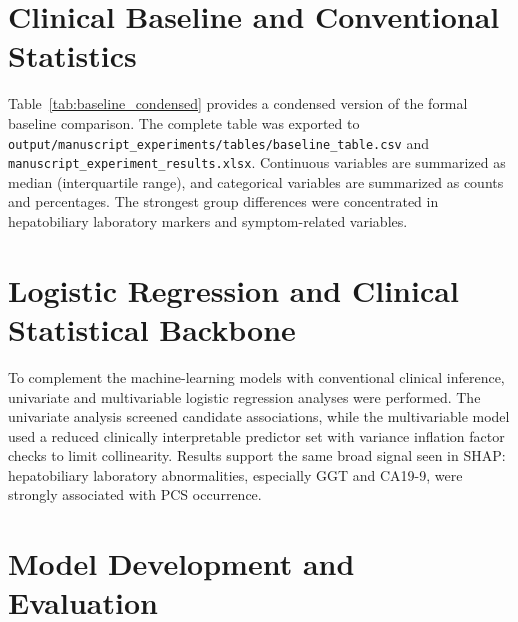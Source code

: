 \documentclass[11pt]{article}
\begin{document}
\section{Clinical Baseline and Conventional Statistics}

Table~\ref{tab:baseline_condensed} provides a condensed version of the formal baseline comparison. The complete table was exported to \texttt{output/manuscript\_experiments/tables/baseline\_table.csv} and \texttt{manuscript\_experiment\_results.xlsx}. Continuous variables are summarized as median (interquartile range), and categorical variables are summarized as counts and percentages. The strongest group differences were concentrated in hepatobiliary laboratory markers and symptom-related variables.

\begin{table}[H]
\centering
\caption{Condensed baseline comparison between PCS and non-PCS groups.}
\label{tab:baseline_condensed}
\scriptsize
\resizebox{\textwidth}{!}{\TableBaselineCondensed}
\end{table}

\section{Logistic Regression and Clinical Statistical Backbone}

To complement the machine-learning models with conventional clinical inference, univariate and multivariable logistic regression analyses were performed. The univariate analysis screened candidate associations, while the multivariable model used a reduced clinically interpretable predictor set with variance inflation factor checks to limit collinearity. Results support the same broad signal seen in SHAP: hepatobiliary laboratory abnormalities, especially GGT and CA19-9, were strongly associated with PCS occurrence.

\begin{table}[H]
\centering
\caption{Top univariate logistic regression results.}
\label{tab:univariate_logistic}
\scriptsize
\resizebox{\textwidth}{!}{\TableUnivariateTop}
\end{table}

\begin{table}[H]
\centering
\caption{Multivariable logistic regression after collinearity-aware predictor reduction.}
\label{tab:multivariable_logistic}
\small
\TableMultivariable
\end{table}

\section{Model Development and Evaluation}
\end{document}
